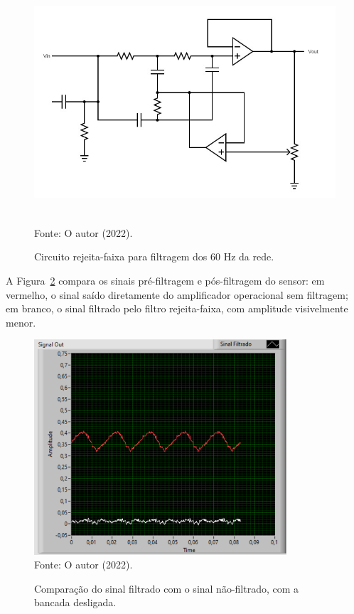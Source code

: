 \documentclass[
	12pt,				
	oneside,			
	a4paper,			
	english,			
	brazil,	
	sumario=abnt-6027-2012		
	]{abntex2ppgsi}
\begin{document}
\begin{figure}[H]
\centering
\caption {Circuito rejeita-faixa para filtragem dos 60 Hz da rede.}
\includegraphics[width=\textwidth,height=90mm,keepaspectratio]{circuito_notch} \\
Fonte: O autor (2022).
\label{circuito_notch}
\end{figure} 

A Figura~\ref{sinal_filtrado_maquina_desligada} compara os sinais pré-filtragem e pós-filtragem do sensor: em vermelho, o sinal saído diretamente do amplificador operacional sem filtragem; em branco, o sinal filtrado pelo filtro rejeita-faixa, com amplitude visivelmente menor.

\begin{figure}[H]
\centering
\caption {Comparação do sinal filtrado com o sinal não-filtrado, com a bancada desligada.}
\includegraphics[width=\textwidth,height=80mm,keepaspectratio]{GraficosAnalise/sinal_filtrado_maquina_desligada} \\
Fonte: O autor (2022).
\label{sinal_filtrado_maquina_desligada}
\end{figure} 
\end{document}
